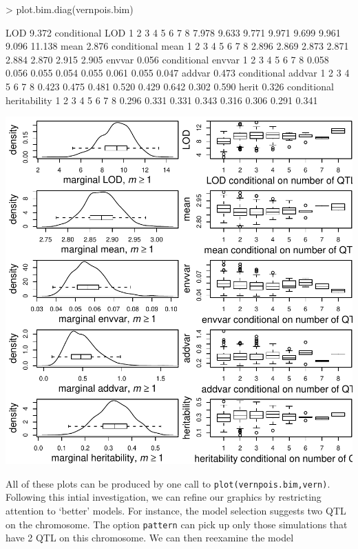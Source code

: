 \documentclass{article}
\begin{document}
\begin{Schunk}
\begin{Sinput}
> plot.bim.diag(vernpois.bim)
\end{Sinput}
\begin{Soutput}
LOD 9.372 
conditional LOD 
     1      2      3      4      5      6      7      8 
 7.978  9.633  9.771  9.971  9.699  9.961  9.096 11.138 
mean 2.876 
conditional mean 
    1     2     3     4     5     6     7     8 
2.896 2.869 2.873 2.871 2.884 2.870 2.915 2.905 
envvar 0.056 
conditional envvar 
    1     2     3     4     5     6     7     8 
0.058 0.056 0.055 0.054 0.055 0.061 0.055 0.047 
addvar 0.473 
conditional addvar 
    1     2     3     4     5     6     7     8 
0.423 0.475 0.481 0.520 0.429 0.642 0.302 0.590 
herit 0.326 
conditional heritability 
    1     2     3     4     5     6     7     8 
0.296 0.331 0.331 0.343 0.316 0.306 0.291 0.341 
\end{Soutput}
\end{Schunk}
\includegraphics{bim_summary-009}

All of these plots can be produced by one call to
\texttt{plot(vernpois.bim,vern)}. Following this intial investigation, we
can refine our graphics by restricting attention to `better'
models. For instance, the model selection suggests two QTL on the
chromosome. The option \texttt{pattern}  can pick up only those
simulations that have 2 QTL on this chromosome. We can then reexamine
the model
\end{document}
